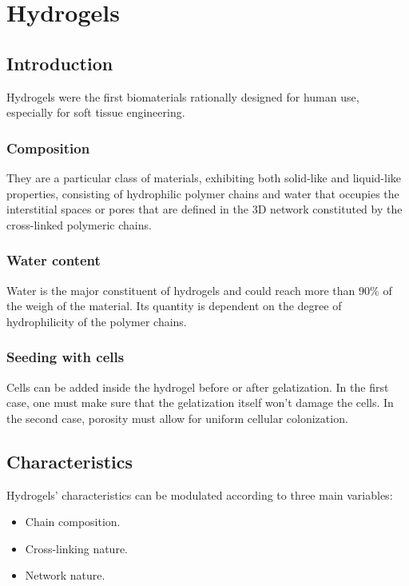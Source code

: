 \graphicspath{{chapters/06/images/}}
\chapter{Hydrogels}


\section{Introduction}
Hydrogels were the first biomaterials rationally designed for human use, especially for soft tissue engineering.

	\subsection{Composition}
	They are a particular class of materials, exhibiting both solid-like and liquid-like properties, consisting of hydrophilic polymer chains and water that occupies the interstitial spaces or pores that are defined in the 3D network constituted by the cross-linked polymeric chains.

	\subsection{Water content}
	Water is the major constituent of hydrogels and could reach more than $90\%$ of the weigh of the material.
	Its quantity is dependent on the degree of hydrophilicity of the polymer chains.

	\subsection{Seeding with cells}
	Cells can be added inside the hydrogel before or after gelatization.
	In the first case, one must make sure that the gelatization itself won’t damage the cells.
	In the second case, porosity must allow for uniform cellular colonization.

\section{Characteristics}
Hydrogels’ characteristics can be modulated according to three main variables:

\begin{multicols}{3}
	\begin{itemize}
		\item Chain composition.
		\item Cross-linking nature.
		\item Network nature.
	\end{itemize}
\end{multicols}


